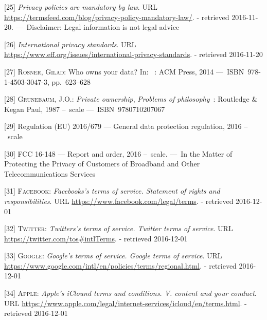 \documentclass[12pt,english,a4paper,titlepage,cleardoublepage=empty,dottedtoc]{report}
\begin{document}
\hypertarget{ref-web_2016_privacy-policies-are-mandatory-by-law}{}
{[}25{]} \emph{Privacy policies are mandatory by law}. URL
\url{https://termsfeed.com/blog/privacy-policy-mandatory-law/}. -
retrieved 2016-11-20. ---~Disclaimer: Legal information is not legal
advice

\hypertarget{ref-web_2016_international-privacy-standards}{}
{[}26{]} \emph{International privacy standards}. URL
\url{https://www.eff.org/issues/international-privacy-standards}. -
retrieved 2016-11-20

\hypertarget{ref-paper_2014_who-owns-yours-data}{}
{[}27{]} \textsc{Rosner, Gilad}: Who owns your data? In: ~: ACM Press,
2014 ---~ISBN~978-1-4503-3047-3, pp.~623--628

\hypertarget{ref-book_1987_private-ownership_definition}{}
{[}28{]} \textsc{Grunebaum, J.O.}: \emph{Private ownership},
\emph{Problems of philosophy}~: Routledge \& Kegan Paul, 1987 --~scale
---~ISBN~9780710207067

\hypertarget{ref-regulation_2016_eu_general-data-protection-regulation_ownership}{}
{[}29{]} Regulation (EU) 2016/679 --- General data protection
regulation, 2016 --~scale

\hypertarget{ref-rules_2016_fcc_to-protect-broadband-consumer-privacy_ownership}{}
{[}30{]} FCC 16-148 --- Report and order, 2016 --~scale. ---~In the
Matter of Protecting the Privacy of Customers of Broadband and Other
Telecommunications Services

\hypertarget{ref-web_2016_facebook_terms-of-service}{}
{[}31{]} \textsc{Facebook}: \emph{Facebooks's terms of service.
Statement of rights and responsibilities}. URL
\url{https://www.facebook.com/legal/terms}. - retrieved 2016-12-01

\hypertarget{ref-web_2016_twitter_terms-of-service}{}
{[}32{]} \textsc{Twitter}: \emph{Twitters's terms of service. Twitter
terms of service}. URL \url{https://twitter.com/tos\#intlTerms}. -
retrieved 2016-12-01

\hypertarget{ref-web_2016_google_terms-of-service}{}
{[}33{]} \textsc{Google}: \emph{Google's terms of service. Google terms
of service}. URL
\url{https://www.google.com/intl/en/policies/terms/regional.html}. -
retrieved 2016-12-01

\hypertarget{ref-web_2016_apple-icloud_terms-of-service}{}
{[}34{]} \textsc{Apple}: \emph{Apple's iClound terms and conditions. V.
content and your conduct}. URL
\url{https://www.apple.com/legal/internet-services/icloud/en/terms.html}.
- retrieved 2016-12-01
\end{document}
